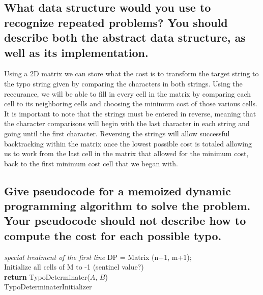 \documentclass[letterpaper,12pt]{article}
\begin{document}
\subsection{What data structure would you use to recognize repeated problems? You should describe both the abstract data structure, as well as its implementation.}
Using a 2D matrix we can store what the cost is to transform the target string to the typo string given by comparing the characters in both strings. Using the reccurance, we will be able to fill in every cell in the matrix by comparing each cell to its neighboring cells and choosing the minimum cost of those various cells. It is important to note that the strings must be entered in reverse, meaning that the character comparisons will begin with the last character in each string and going until the first character. Reversing the strings will allow successful backtracking within the matrix once the lowest possible cost is totaled allowing us to work from the last cell in the matrix that allowed for the minimum cost, back to the first minimum cost cell that we began with.  

\subsection{Give pseudocode for a memoized dynamic programming algorithm to solve the problem. Your pseudocode should not describe how to compute the cost for each possible typo.}

\IncMargin{1em}
\begin{algorithm}
\BlankLine
\emph{special treatment of the first line}\;
{DP = Matrix (n+1, m+1);}\\ 
{Initialize all cells of M to -1 (sentinel value?)}\\
\textbf{return} {TypoDeterminater($A$, $B$)}\\
\caption{TypoDeterminaterInitializer\label{IR}}
\end{algorithm}\DecMargin{1em}
\end{document}
